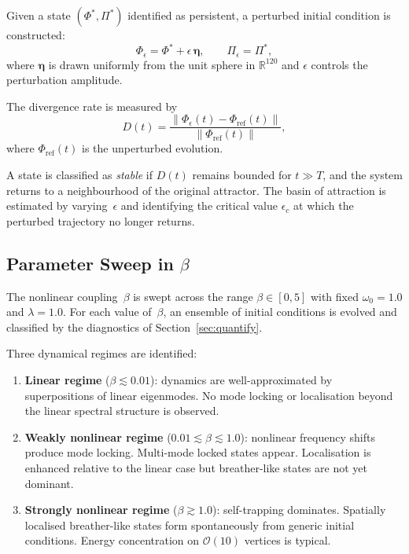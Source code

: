 \documentclass[12pt,a4paper]{article}
\newcommand{\R}{\mathbb{R}}
\begin{document}
Given a state $(\Phi^*, \Pi^*)$ identified as persistent, a perturbed
initial condition is constructed:
\begin{equation}\label{eq:perturb}
  \Phi_{\epsilon} = \Phi^* + \epsilon \, \boldsymbol{\eta},
  \qquad
  \Pi_{\epsilon} = \Pi^*,
\end{equation}
where $\boldsymbol{\eta}$ is drawn uniformly from the unit sphere in
$\R^{120}$ and $\epsilon$ controls the perturbation amplitude.

The divergence rate is measured by
\begin{equation}\label{eq:diverge}
  D(t) = \frac{\lVert \Phi_{\epsilon}(t)
    - \Phi_{\mathrm{ref}}(t) \rVert}
    {\lVert \Phi_{\mathrm{ref}}(t) \rVert},
\end{equation}
where $\Phi_{\mathrm{ref}}(t)$ is the unperturbed evolution.

A state is classified as \emph{stable} if $D(t)$ remains bounded for
$t \gg T$, and the system returns to a neighbourhood of the original
attractor.  The basin of attraction is estimated by varying~$\epsilon$
and identifying the critical value $\epsilon_c$ at which the perturbed
trajectory no longer returns.

\subsection{Parameter Sweep in $\beta$}\label{sec:sweep}

The nonlinear coupling~$\beta$ is swept across the range
$\beta \in [0, 5]$ with fixed $\omega_0 = 1.0$ and $\lambda = 1.0$.
For each value of~$\beta$, an ensemble of initial conditions is
evolved and classified by the diagnostics of
Section~\ref{sec:quantify}.

Three dynamical regimes are identified:

\begin{enumerate}[nosep]
\item \textbf{Linear regime} ($\beta \lesssim 0.01$):
  dynamics are well-approximated by superpositions of linear
  eigenmodes.  No mode locking or localisation beyond the linear
  spectral structure is observed.

\item \textbf{Weakly nonlinear regime}
  ($0.01 \lesssim \beta \lesssim 1.0$):
  nonlinear frequency shifts produce mode locking.
  Multi-mode locked states appear.  Localisation is enhanced
  relative to the linear case but breather-like states are
  not yet dominant.

\item \textbf{Strongly nonlinear regime} ($\beta \gtrsim 1.0$):
  self-trapping dominates.  Spatially localised breather-like
  states form spontaneously from generic initial conditions.
  Energy concentration on $\mathcal{O}(10)$ vertices is
  typical.
\end{enumerate}
\end{document}
